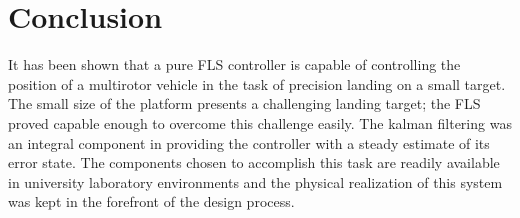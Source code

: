 

\section{Conclusion}
It has been shown that a pure FLS controller is capable of controlling the position of a multirotor vehicle in
the task of precision landing on a small target. The small size of the platform presents a challenging
landing target; the FLS proved capable enough to overcome this challenge easily. The kalman filtering was an
integral component in providing the controller with a steady estimate of its error state. The components
chosen to accomplish this task are readily available in university laboratory environments and the physical
realization of this system was kept in the forefront of the design process. 

